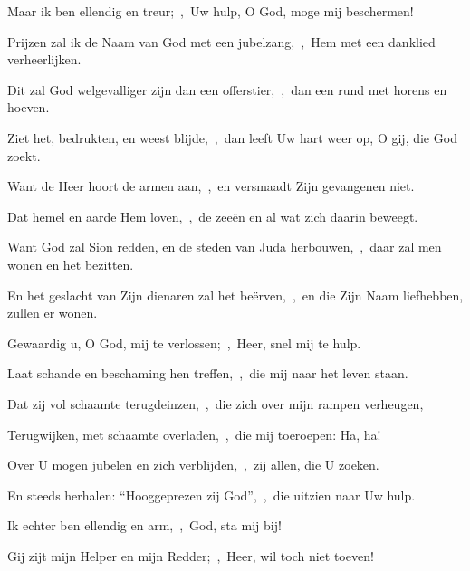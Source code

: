 \documentclass[12pt,twoside,a5paper]{article}
\begin{document}

\begin{halfparskip}
  Maar ik ben ellendig en treur;~\sep\ Uw hulp, O God, moge mij beschermen!

  Prijzen zal ik de Naam van God met een jubelzang,~\sep\ Hem met een danklied verheerlijken.

  Dit zal God welgevalliger zijn dan een offerstier,~\sep\ dan een rund met horens en hoeven.

  Ziet het, bedrukten, en weest blijde,~\sep\ dan leeft Uw hart weer op, O gij, die God zoekt.

  Want de Heer hoort de armen aan,~\sep\ en versmaadt Zijn gevangenen niet.

  Dat hemel en aarde Hem loven,~\sep\ de zeeën en al wat zich daarin beweegt.

  Want God zal Sion redden, en de steden van Juda herbouwen,~\sep\ daar zal men wonen en het bezitten.

  En het geslacht van Zijn dienaren zal het beërven,~\sep\ en die Zijn Naam liefhebben, zullen er wonen.
\end{halfparskip}


\begin{halfparskip}
  Gewaardig u, O God, mij te verlossen;~\sep\ Heer, snel mij te hulp.


  Laat schande en beschaming hen treffen,~\sep\ die mij naar het leven staan.

  Dat zij vol schaamte terugdeinzen,~\sep\ die zich over mijn rampen verheugen,

  Terugwijken, met schaamte overladen,~\sep\ die mij toeroepen: Ha, ha!

  Over U mogen jubelen en zich verblijden,~\sep\ zij allen, die U zoeken.

  En steeds herhalen: ``Hooggeprezen zij God'',~\sep\ die uitzien naar Uw hulp.

  Ik echter ben ellendig en arm,~\sep\ God, sta mij bij!

  Gij zijt mijn Helper en mijn Redder;~\sep\ Heer, wil toch niet toeven!
\end{halfparskip}


\end{document}
